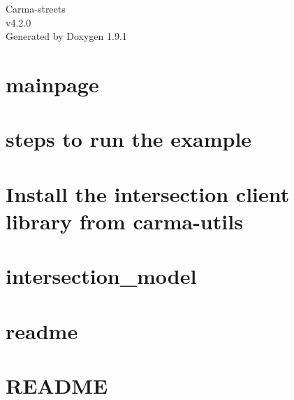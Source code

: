 \let\mypdfximage\pdfximage\def\pdfximage{\immediate\mypdfximage}\documentclass[twoside]{book}
\newcommand{\+}{\discretionary{\mbox{\scriptsize$\hookleftarrow$}}{}{}}
\newcommand{\clearemptydoublepage}{%
  \newpage{\pagestyle{empty}\cleardoublepage}%
}
\begin{document}
\raggedbottom

\hypersetup{pageanchor=false,
             bookmarksnumbered=true,
             pdfencoding=unicode
            }
\begin{titlepage}
\vspace*{7cm}
\begin{center}%
{\Large Carma-\/streets \\[1ex]\large v4.\+2.\+0 }\\
\vspace*{1cm}
{\large Generated by Doxygen 1.9.1}\\
\end{center}
\end{titlepage}
\clearemptydoublepage
{}
\tableofcontents
\clearemptydoublepage
{}
\hypersetup{pageanchor=true}

\chapter{mainpage}
\label{md_docs_mainpage}

\chapter{steps to run the example}
\label{md_examples_kafka_examples_readme}

\chapter{Install the intersection client library from carma-\/utils}
\label{md_examples_qt_rest_clients_api_intersection_client_README}

\chapter{intersection\+\_\+model}
\label{md_intersection_model_readme}

\chapter{readme}
\label{md_kafka_clients_readme}

\chapter{README}
\label{md_README}

\end{document}
